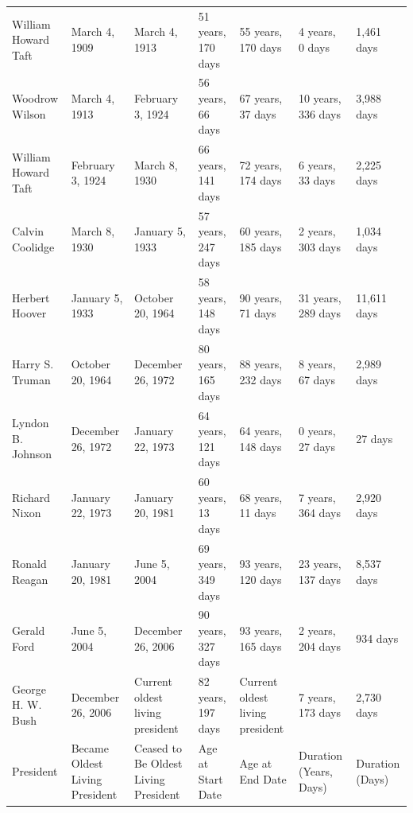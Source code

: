 \documentclass{article}
\begin{document}
\begin{tabular}{lllllll}
William Howard Taft & March 4, 1909 & March 4, 1913 & 51 years, 170 days & 55 years, 170 days & 4 years, 0 days & 1,461 days \\
Woodrow Wilson & March 4, 1913 & February 3, 1924 & 56 years, 66 days & 67 years, 37 days & 10 years, 336 days & 3,988 days \\
William Howard Taft & February 3, 1924 & March 8, 1930 & 66 years, 141 days & 72 years, 174 days & 6 years, 33 days & 2,225 days \\
Calvin Coolidge & March 8, 1930 & January 5, 1933 & 57 years, 247 days & 60 years, 185 days & 2 years, 303 days & 1,034 days \\
Herbert Hoover & January 5, 1933 & October 20, 1964 & 58 years, 148 days & 90 years, 71 days & 31 years, 289 days & 11,611 days \\
Harry S. Truman & October 20, 1964 & December 26, 1972 & 80 years, 165 days & 88 years, 232 days & 8 years, 67 days & 2,989 days \\
Lyndon B. Johnson & December 26, 1972 & January 22, 1973 & 64 years, 121 days & 64 years, 148 days & 0 years, 27 days & 27 days \\
Richard Nixon & January 22, 1973 & January 20, 1981 & 60 years, 13 days & 68 years, 11 days & 7 years, 364 days & 2,920 days \\
Ronald Reagan & January 20, 1981 & June 5, 2004 & 69 years, 349 days & 93 years, 120 days & 23 years, 137 days & 8,537 days \\
Gerald Ford & June 5, 2004 & December 26, 2006 & 90 years, 327 days & 93 years, 165 days & 2 years, 204 days & 934 days \\
George H. W. Bush & December 26, 2006 & Current oldest living president & 82 years, 197 days & Current oldest living president & 7 years, 173 days & 2,730 days \\
President & Became Oldest Living President & Ceased to Be Oldest Living President & Age at Start Date & Age at End Date & Duration (Years, Days) & Duration (Days) \\
\bottomrule
\end{tabular}
\end{document}
